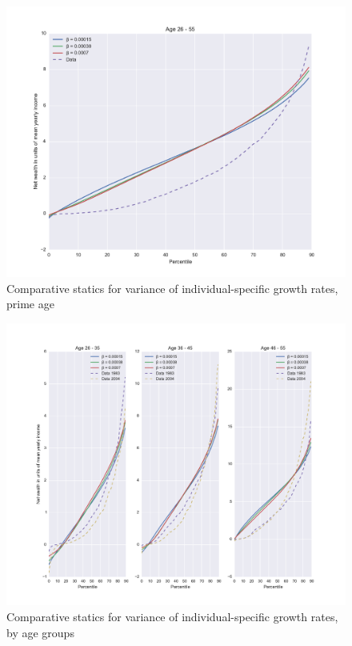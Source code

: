 \begin{figure}
\includegraphics[width=\columnwidth]{comp_stat_beta}
\caption{Comparative statics for variance of individual-specific growth rates, prime age}
\label{fig:comp_stat_beta}
\end{figure}

\begin{figure}
\includegraphics[width=\columnwidth]{comp_stat_beta_agedetail}
\caption{Comparative statics for variance of individual-specific growth rates, by age groups}
\label{fig:comp_stat_beta_agedetail}
\end{figure}


